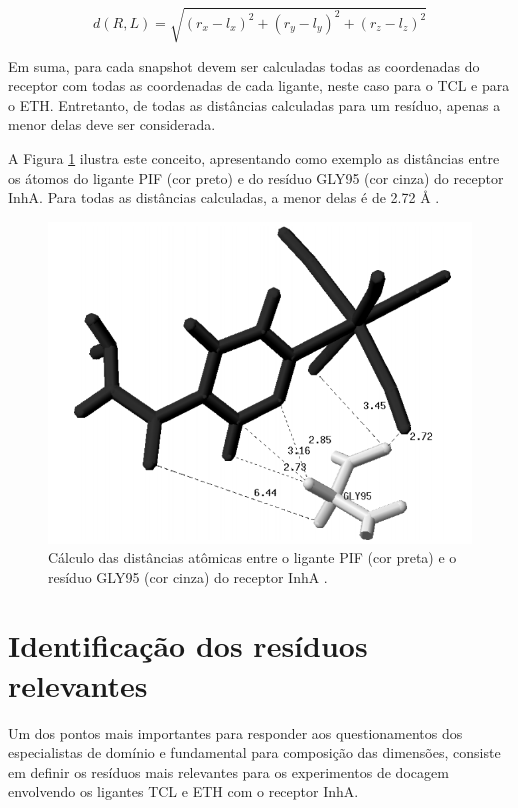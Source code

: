 \begin{equation}
\label{eqt:distEuclid}
	d(R,L)=\sqrt{(r_{x}-l_{x})^{2}+(r_{y}-l_{y})^{2}+(r_{z}-l_{z})^{2}}
\end{equation}

Em suma, para cada snapshot devem ser calculadas todas as coordenadas do receptor com todas as coordenadas de cada ligante, neste caso para o TCL e para o ETH. Entretanto, de todas as distâncias calculadas para um resíduo, apenas a menor delas deve ser considerada. 

A Figura \ref{fig:PIFvsGLY} ilustra este conceito, apresentando como exemplo as distâncias entre os átomos do ligante PIF (cor preto) e do resíduo GLY95 (cor cinza) do receptor InhA. Para todas as distâncias calculadas, a menor delas é de 2.72 {\AA} \cite{KARANADUNOSM09}.

\begin{figure}[h]
	\center
	\includegraphics[scale=0.55]{images/distEucli.png}
	\caption{Cálculo das distâncias atômicas entre o ligante PIF (cor preta) e o resíduo GLY95 (cor cinza) do receptor InhA \cite{KARANADUNOSM09}.}
	\label{fig:PIFvsGLY}
\end{figure} 

\section{Identificação dos resíduos relevantes}

Um dos pontos mais importantes para responder aos questionamentos dos especialistas de domínio e fundamental para composição das dimensões, consiste em definir os resíduos mais relevantes para os experimentos de docagem envolvendo os ligantes TCL e ETH com o receptor InhA. 

